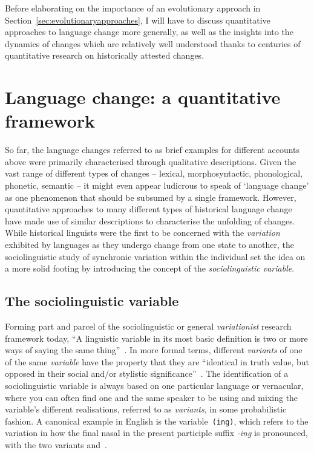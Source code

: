 Before elaborating on the importance of an evolutionary approach in Section~\ref{sec:evolutionaryapproaches}, I will have to discuss quantitative approaches to language change more generally, as well as the insights into the dynamics of changes which are relatively well understood thanks to centuries of quantitative research on historically attested changes.

\section{Language change: a quantitative framework}

So far, the language changes referred to as brief examples for different accounts above were primarily characterised through qualitative descriptions. Given the vast range of different types of changes -- lexical, morphosyntactic, phonological, phonetic, semantic -- it might even appear ludicrous to speak of `language change' as one phenomenon that should be subsumed by a single framework.
However, quantitative approaches to many different types of historical language change have made use of similar descriptions to characterise the unfolding of changes. While historical linguists were the first to be concerned with the \emph{variation} exhibited by languages as they undergo change from one state to another, the sociolinguistic study of synchronic variation within the individual set the idea on a more solid footing by introducing the concept of the \emph{sociolinguistic variable}.

\subsection{The sociolinguistic variable}
\label{sec:sociolinguisticvariable}

Forming part and parcel of the sociolinguistic or general \emph{variationist} research framework today,
``A linguistic variable in its most basic definition is two or more ways of saying the same thing''~\citep[p.4]{Tagliamonte2012}.
In more formal terms, different \emph{variants} of one of the same \emph{variable} have the property that they are ``identical in truth value, but opposed in their social and/or stylistic significance''~\citep[p.271]{Labov1972}. %
The identification of a sociolinguistic variable is always based on one particular language or vernacular, where you can often find one and the same speaker to be using and mixing the variable's different realisations, referred to as \emph{variants}, in some probabilistic fashion. A canonical example in English is the variable~\texttt{(ing)}, which refers to the variation in how the final nasal in the present participle suffix \emph{-ing} is pronounced, with the two variants \textipa{[n]} and~\textipa{[N]}.

